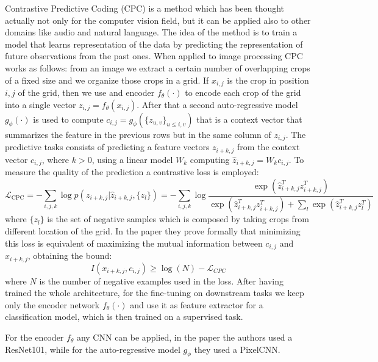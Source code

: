 Contrastive Predictive Coding (CPC) \cite{oord2018representation} is a method which has been thought actually not only for the computer vision field, but it can be applied also to other domains like audio and natural language. The idea of the method is to train a model that learns representation of the data by predicting the representation of future observations from the past ones. When applied to image processing CPC works as follows: from an image we extract a certain number of overlapping crops of a fixed size and we organize those crops in a grid. If $x_{i,j}$ is the crop in position $i, j$ of the grid, then we use and encoder $f_\theta(\cdot)$ to encode each crop of the grid into a single vector $z_{i,j} = f_\theta(x_{i,j})$. After that a second auto-regressive model $g_\phi(\cdot)$ is used to compute $c_{i,j} = g_\phi(\{z_{u,v}\}_{u\le i, v})$ that is a context vector that summarizes the feature in the previous rows but in the same column of $z_{i,j}$. The predictive tasks consists of predicting a feature vectors $z_{i+k,j}$ from the context vector $c_{i,j}$, where $k > 0$, using a linear model $W_k$ computing $\hat{z}_{i+k,j} = W_kc_{i,j}$. To measure the quality of the prediction a contrastive loss is employed:
\[ \mathcal{L}_{\text{CPC}} = -\sum_{i,j,k}\log p(z_{i+k,j}|\hat{z}_{i+k,j}, \{z_l\}) = -\sum_{i,j,k}\log \frac{\exp(\hat{z}^T_{i+k,j}z^T_{i+k,j})}{\exp(\hat{z}^T_{i+k,j}z^T_{i+k,j}) + \sum_l \exp(\hat{z}^T_{i+k,j}z^T_l)}\]
where $\{z_l\}$ is the set of negative samples which is composed by taking crops from different location of the grid. In the paper they prove formally that minimizing this loss is equivalent of maximizing the mutual information between $c_{i,j}$ and $x_{i+k,j}$, obtaining the bound:
\[ I(x_{i+k,j}, c_{i,j}) \ge \log(N) - \mathcal{L}_{CPC}\]
where $N$ is the number of negative examples used in the loss. After having trained the whole architecture, for the fine-tuning on downstream tasks we keep only the encoder network $f_\theta(\cdot)$ and use it as feature extractor for a classification model, which is then trained on a supervised task.

For the encoder $f_\theta$ any CNN can be applied, in the paper the authors used a ResNet101, while for the auto-regressive model $g_\phi$ they used a PixelCNN.
